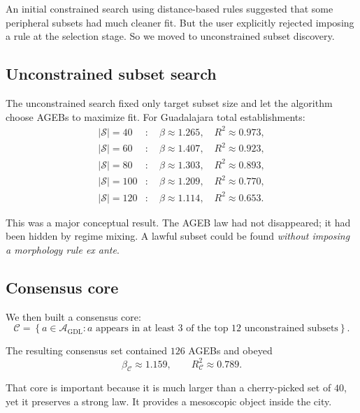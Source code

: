 \documentclass[11pt]{article}
\begin{document}
An initial constrained search using distance-based rules suggested that some peripheral subsets had much cleaner fit. But the user explicitly rejected imposing a rule at the selection stage. So we moved to unconstrained subset discovery.

\subsection{Unconstrained subset search}

The unconstrained search fixed only target subset size and let the algorithm choose AGEBs to maximize fit. For Guadalajara total establishments:
\begin{align}
|\mathcal{S}|=40 &: \quad \beta \approx 1.265,\quad R^2 \approx 0.973,\\
|\mathcal{S}|=60 &: \quad \beta \approx 1.407,\quad R^2 \approx 0.923,\\
|\mathcal{S}|=80 &: \quad \beta \approx 1.303,\quad R^2 \approx 0.893,\\
|\mathcal{S}|=100 &: \quad \beta \approx 1.209,\quad R^2 \approx 0.770,\\
|\mathcal{S}|=120 &: \quad \beta \approx 1.114,\quad R^2 \approx 0.653.
\end{align}

This was a major conceptual result. The AGEB law had not disappeared; it had been hidden by regime mixing. A lawful subset could be found \emph{without imposing a morphology rule ex ante}.

\subsection{Consensus core}

We then built a consensus core:
\begin{equation}
\mathcal{C}
=
\left\{
a \in \mathcal{A}_{\mathrm{GDL}} :
a \text{ appears in at least 3 of the top 12 unconstrained subsets}
\right\}.
\end{equation}

The resulting consensus set contained \(126\) AGEBs and obeyed
\begin{equation}
\beta_{\mathcal{C}} \approx 1.159,
\qquad
R^2_{\mathcal{C}} \approx 0.789.
\end{equation}

That core is important because it is much larger than a cherry-picked set of \(40\), yet it preserves a strong law. It provides a mesoscopic object inside the city.
\end{document}
